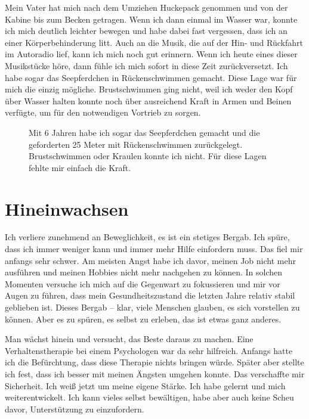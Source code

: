 \documentclass[fontsize=14pt,a4paper,headinclude,DIV=calc,automark]{scrbook}
\begin{document}
Mein Vater hat mich nach dem Umziehen Huckepack genommen und von der Kabine bis zum Becken getragen. Wenn ich dann einmal im Wasser war, konnte ich mich deutlich leichter bewegen und habe dabei fast vergessen, dass ich an einer Körperbehinderung litt. Auch an die Musik, die auf der Hin- und Rückfahrt im Autoradio lief, kann ich mich noch gut erinnern. Wenn ich heute eines dieser Musikstücke höre, dann fühle ich mich sofort in diese Zeit zurückversetzt. Ich habe sogar das Seepferdchen in Rückenschwimmen gemacht. Diese Lage war für mich die einzig mögliche. Brustschwimmen ging nicht, weil ich weder den Kopf über Wasser halten konnte noch über ausreichend Kraft in Armen und Beinen verfügte, um für den notwendigen Vortrieb zu sorgen.

\setlength{\fboxsep}{0pt}    %
\setlength{\fboxrule}{0.2pt} %
\begin{figure}[H]
    \centering
    \caption{Mit 6 Jahren habe ich sogar das Seepferdchen gemacht und die geforderten 25 Meter mit Rückenschwimmen zurückgelegt. Brustschwimmen oder Kraulen konnte ich nicht. Für diese Lagen fehlte mir einfach die Kraft.}
    \label{fig:seepferdchen}
\end{figure}

\section{Hineinwachsen}

Ich verliere zunehmend an Beweglichkeit, es ist ein stetiges Bergab. Ich spüre, dass ich immer weniger kann und immer mehr Hilfe einfordern muss. Das fiel mir anfangs sehr schwer. Am meisten Angst habe ich davor, meinen Job nicht mehr ausführen und meinen Hobbies nicht mehr nachgehen zu können. In solchen Momenten versuche ich mich auf die Gegenwart zu fokussieren und mir vor Augen zu führen, dass mein Gesundheitszustand die letzten Jahre relativ stabil geblieben ist. Dieses Bergab – klar, viele Menschen glauben, es sich vorstellen zu können. Aber es zu spüren, es selbst zu erleben, das ist etwas ganz anderes.

Man wächst hinein und versucht, das Beste daraus zu machen. Eine Verhaltenstherapie bei einem Psychologen war da sehr hilfreich. Anfangs hatte ich die Befürchtung, dass diese Therapie nichts bringen würde. Später aber stellte ich fest, dass ich besser mit meinen Ängsten umgehen konnte. Das verschaffte mir Sicherheit. Ich weiß jetzt um meine eigene Stärke. Ich habe gelernt und mich weiterentwickelt. Ich kann vieles selbst bewältigen, habe aber auch keine Scheu davor, Unterstützung zu einzufordern.
\end{document}
